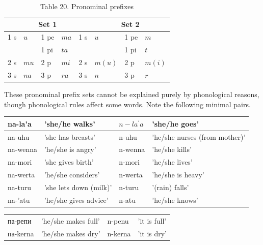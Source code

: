 \documentclass[10pt]{article}
\begin{document}
\begin{table}[h]
\begin{center}
\captionsetup{labelformat=empty}
\caption{Table 20. Pronominal prefixes}
\begin{tabular}{|llll|llll|}
\multicolumn{5}{c}{Set 1} & \multicolumn{4}{c}{Set 2} \\
\hline
1 s & \(u\) & 1 pe & \(m a\) & 1 s & \(u\) & 1 pe & \(m\) &  \\
 &  & 1 pi & \(t a\) &  &  & 1 pi & \(t\) &  \\
2 s & \(m u\) & 2 p & \(m i\) & 2 s & \(m(u)\) & 2 p & \(m(i)\) &  \\
3 s & \(n a\) & 3 p & \(r a\) & 3 s & \(n\) & 3 p & \(r\) &  \\
\hline
\end{tabular}
\end{center}
\end{table}

These pronominal prefix sets cannot be explained purely by phonological reasons, though phonological rules affect some words. Note the following minimal pairs.

\begin{center}
\begin{tabular}{|l|l|l|l|}
\hline
na-la'a & 'she/he walks' & \(n-l a^{\prime} a\) & 'she/he goes' \\
\hline
na-uhu & 'she has breasts' & n-uhu & 'he/she nurses (from mother)' \\
\hline
na-wenna & 'he/she is angry' & n-wenna & 'he/she kills' \\
\hline
na-mori & 'she gives birth' & n-mori & 'he/she lives' \\
\hline
na-werta & 'he/she considers' & n-werta & 'he/she is heavy' \\
\hline
na-turu & 'she lets down (milk)' & n-turu & '(rain) falls' \\
\hline
na-'atu & 'he/she gives advice' & n-atu & 'he/she knows' \\
\hline
\end{tabular}
\end{center}

\begin{center}
\begin{tabular}{llll}
па-репи & 'he/she makes full' & n-penu & 'it is full' \\
па-kerna & 'he/she makes dry' & n-kerna & 'it is dry' \\
\end{tabular}
\end{center}
\end{document}
